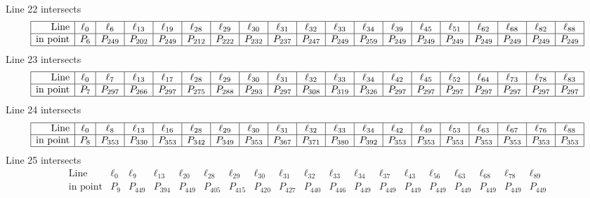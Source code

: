 \documentclass{article}
\begin{document}
{$$\begin{array}{|r*{18}{|c}|}
\end{array}
$$
Line 22 intersects 
$$
\begin{array}{|r*{18}{|c}|}
\hline
\mbox{Line}  & \ell_{0} & \ell_{6} & \ell_{13} & \ell_{19} & \ell_{28} & \ell_{29} & \ell_{30} & \ell_{31} & \ell_{32} & \ell_{33} & \ell_{34} & \ell_{39} & \ell_{45} & \ell_{51} & \ell_{62} & \ell_{68} & \ell_{82} & \ell_{88}\\
\hline
\mbox{in point}  & P_{6} & P_{249} & P_{202} & P_{249} & P_{212} & P_{222} & P_{232} & P_{237} & P_{247} & P_{249} & P_{259} & P_{249} & P_{249} & P_{249} & P_{249} & P_{249} & P_{249} & P_{249}\\
\hline
\end{array}
$$
Line 23 intersects 
$$
\begin{array}{|r*{18}{|c}|}
\hline
\mbox{Line}  & \ell_{0} & \ell_{7} & \ell_{13} & \ell_{17} & \ell_{28} & \ell_{29} & \ell_{30} & \ell_{31} & \ell_{32} & \ell_{33} & \ell_{34} & \ell_{42} & \ell_{45} & \ell_{52} & \ell_{64} & \ell_{73} & \ell_{78} & \ell_{83}\\
\hline
\mbox{in point}  & P_{7} & P_{297} & P_{266} & P_{297} & P_{275} & P_{288} & P_{293} & P_{297} & P_{308} & P_{319} & P_{326} & P_{297} & P_{297} & P_{297} & P_{297} & P_{297} & P_{297} & P_{297}\\
\hline
\end{array}
$$
Line 24 intersects 
$$
\begin{array}{|r*{18}{|c}|}
\hline
\mbox{Line}  & \ell_{0} & \ell_{8} & \ell_{13} & \ell_{16} & \ell_{28} & \ell_{29} & \ell_{30} & \ell_{31} & \ell_{32} & \ell_{33} & \ell_{34} & \ell_{42} & \ell_{49} & \ell_{53} & \ell_{63} & \ell_{67} & \ell_{76} & \ell_{88}\\
\hline
\mbox{in point}  & P_{8} & P_{353} & P_{330} & P_{353} & P_{342} & P_{349} & P_{353} & P_{367} & P_{371} & P_{380} & P_{392} & P_{353} & P_{353} & P_{353} & P_{353} & P_{353} & P_{353} & P_{353}\\
\hline
\end{array}
$$
Line 25 intersects 
$$
\begin{array}{|r*{18}{|c}|}
\hline
\mbox{Line}  & \ell_{0} & \ell_{9} & \ell_{13} & \ell_{20} & \ell_{28} & \ell_{29} & \ell_{30} & \ell_{31} & \ell_{32} & \ell_{33} & \ell_{34} & \ell_{37} & \ell_{43} & \ell_{56} & \ell_{63} & \ell_{68} & \ell_{78} & \ell_{89}\\
\hline
\mbox{in point}  & P_{9} & P_{449} & P_{394} & P_{449} & P_{405} & P_{415} & P_{420} & P_{427} & P_{440} & P_{446} & P_{449} & P_{449} & P_{449} & P_{449} & P_{449} & P_{449} & P_{449} & P_{449}\\

\end{array}$$}
\end{document}
